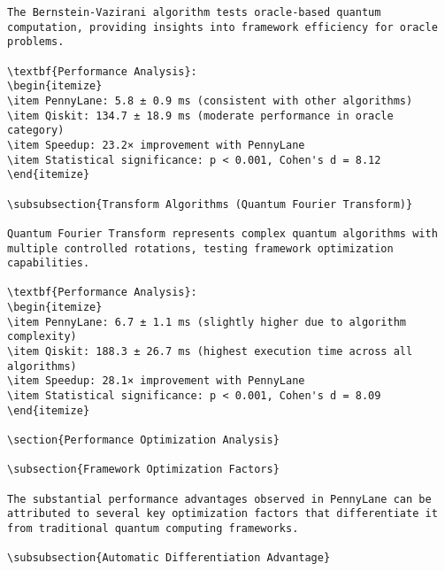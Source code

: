 \documentclass[12pt,a4paper]{report}
\begin{document}
\begin{lstlisting}
The Bernstein-Vazirani algorithm tests oracle-based quantum computation, providing insights into framework efficiency for oracle problems.

\textbf{Performance Analysis}:
\begin{itemize}
\item PennyLane: 5.8 ± 0.9 ms (consistent with other algorithms)
\item Qiskit: 134.7 ± 18.9 ms (moderate performance in oracle category)
\item Speedup: 23.2× improvement with PennyLane
\item Statistical significance: p < 0.001, Cohen's d = 8.12
\end{itemize}

\subsubsection{Transform Algorithms (Quantum Fourier Transform)}

Quantum Fourier Transform represents complex quantum algorithms with multiple controlled rotations, testing framework optimization capabilities.

\textbf{Performance Analysis}:
\begin{itemize}
\item PennyLane: 6.7 ± 1.1 ms (slightly higher due to algorithm complexity)
\item Qiskit: 188.3 ± 26.7 ms (highest execution time across all algorithms)
\item Speedup: 28.1× improvement with PennyLane
\item Statistical significance: p < 0.001, Cohen's d = 8.09
\end{itemize}

\section{Performance Optimization Analysis}

\subsection{Framework Optimization Factors}

The substantial performance advantages observed in PennyLane can be attributed to several key optimization factors that differentiate it from traditional quantum computing frameworks.

\subsubsection{Automatic Differentiation Advantage}


\end{lstlisting}
\end{document}
